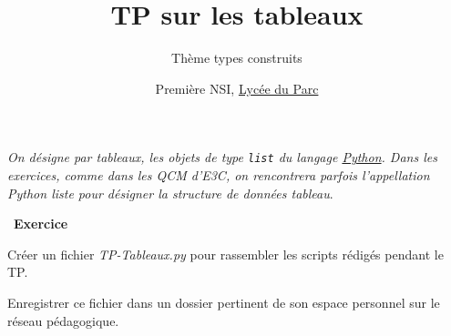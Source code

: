 \documentclass[
  11pt,
]{article}
\title{TP sur les tableaux}
\subtitle{Thème types construits}
\author{Première NSI, \href{https://frederic-junier.org/}{Lycée du
Parc}}
\date{}
\newcommand{\passthrough}[1]{#1}
\newcounter{exo}
\newenvironment{exercice}[1]
{\par \medskip   \addtocounter{exo}{1} \noindent  
\begin{bclogo}[arrondi =0.1,   noborder = true, logo=\bccrayon, marge=4]{~\textbf{Exercice} \textbf{\theexo} {\itshape #1} }  \par}
{
\end{bclogo}
 \par \bigskip }
\begin{document}
\maketitle

\emph{On désigne par tableaux, les objets de type
\passthrough{\lstinline!list!} du langage
\href{https://docs.python.org/3/tutorial/datastructures.html}{Python}.
Dans les exercices, comme dans les QCM d'E3C, on rencontrera parfois
l'appellation Python liste pour désigner la structure de données
tableau}.

\begin{exercice}{}

Créer un fichier \emph{TP-Tableaux.py} pour rassembler les scripts
rédigés pendant le TP.

Enregistrer ce fichier dans un dossier pertinent de son espace personnel
sur le réseau pédagogique.

\end{exercice}
\end{document}
